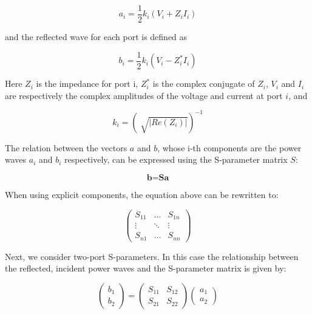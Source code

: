 \documentclass[a4paper,12pt]{report}
\begin{document}
\begin{equation}
  a_i = \frac{1}{2}k_i (V_i + Z_i I_i)
\end{equation}

and the reflected wave for each port is defined as

\begin{equation}
  b_i = \frac{1}{2}k_i (V_i - Z_i^* I_i)
\end{equation}

Here $Z_i$ is the impedance for port i,
$Z_{i}^{*}$ is the complex conjugate of $Z_{i}$,
$V_{i}$ and $I_{i}$ are respectively the complex amplitudes
of the voltage and current at port $i$,
and

\begin{equation}
  k_i = \left(\sqrt[]{|Re(Z_i)|}\right)^{-1}
\end{equation}

The relation between the vectors $a$ and $b$,
whose i-th components are the power waves $a_{i}$
and $b_{i}$ respectively,
can be expressed using the S-parameter matrix $S$:

\begin{equation}
  \textbf{b} = \textbf{S} \textbf{a}
\end{equation}

When using explicit components, the equation above can be rewritten to:

\begin{equation}
  \begin{pmatrix}
    S_{11} & \dots  &S_{1n} \\
    \vdots & \ddots & \vdots \\
    S_{n1} & \dots  & S_{nn}
  \end{pmatrix}
\end{equation}

Next, we consider two-port S-parameters.
In this case the relationship between the reflected,
incident power waves and the S-parameter matrix is given by:

\begin{equation}
  \left(
    \begin{array}{c}
      b_1 \\
      b_2
    \end{array}
  \right) = \begin{pmatrix}
    S_{11} & S_{12} \\
    S_{21} & S_{22}
  \end{pmatrix}
  \left(
    \begin{array}{c}
      a_1 \\
      a_2
    \end{array}
  \right)
\end{equation}
\end{document}
